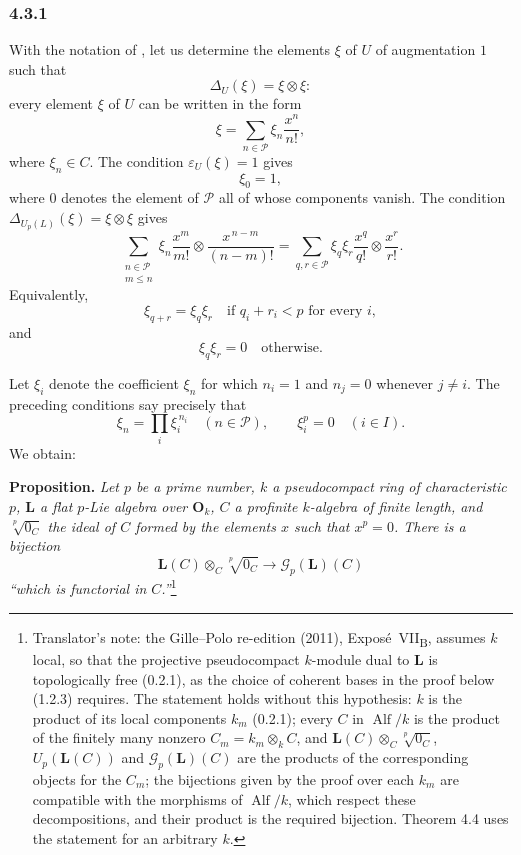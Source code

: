 
\subsubsection*{4.3.1}
\label{sga3:VIIB:4.3.1}

With the notation of , let us determine the elements
\(\xi\) of \(U\) of augmentation \(1\) such that
\[
  \Delta_U(\xi)=\xi\otimes\xi:
\]
every element \(\xi\) of \(U\) can be written in the form
\[
  \xi
  =
  \sum_{n\in\mathcal P}
  \xi_n\frac{x^n}{n!},
\]
where \(\xi_n\in C\).
The condition \(\varepsilon_U(\xi)=1\) gives
\[
  \xi_0=1,
\]
where \(0\) denotes the element of \(\mathcal P\) all of whose
components vanish. The condition
\(\Delta_{U_p(L)}(\xi)=\xi\otimes\xi\) gives
\[
  \sum_{\substack{n\in\mathcal P\\m\leq n}}
  \xi_n
  \frac{x^m}{m!}
  \otimes
  \frac{x^{\,n-m}}{(n-m)!}
  =
  \sum_{q,r\in\mathcal P}
  \xi_q\xi_r
  \frac{x^q}{q!}
  \otimes
  \frac{x^r}{r!}.
\]
Equivalently,
\[
  \xi_{q+r}=\xi_q\xi_r
  \quad\text{if }q_i+r_i<p\text{ for every }i,
\]
and
\[
  \xi_q\xi_r=0
  \quad\text{otherwise}.
\]

Let \(\xi_i\) denote the coefficient \(\xi_n\) for which
\(n_i=1\) and \(n_j=0\) whenever \(j\ne i\). The preceding
conditions say precisely that
\[
  \xi_n=\prod_i\xi_i^{\,n_i}
  \quad(n\in\mathcal P),
  \qquad
  \xi_i^p=0
  \quad(i\in I).
\]
We obtain:

\medskip
\noindent\textbf{Proposition.}
\label{sga3:VIIB:4.3.1:group-like-parametrization}
{\itshape Let \(p\) be a prime number, \(k\) a pseudocompact ring
of characteristic \(p\), \(\mathbf L\) a flat \(p\)-Lie algebra over
\(\mathbf O_k\), \(C\) a profinite \(k\)-algebra of finite length, and
\(\sqrt[p]{0_C}\) the ideal of \(C\) formed by the elements \(x\) such
that \(x^p=0\). There is a bijection
\[
  \mathbf L(C)\otimes_C\sqrt[p]{0_C}
  \longrightarrow
  \mathscr G_p(\mathbf L)(C)
\]
``which is functorial in \(C\).''}\footnote{Translator's note: the Gille--Polo re-edition (2011),
Expos\'e~VII\textsubscript{B}, assumes \(k\) local, so that the projective pseudocompact \(k\)-module dual to
\(\mathbf L\) is topologically free (0.2.1), as the choice of coherent bases in the proof below (1.2.3)
requires. The statement holds without this hypothesis: \(k\) is the product of its local components \(k_m\)
(0.2.1); every \(C\) in \(\operatorname{Alf}/k\) is the product of the finitely many nonzero
\(C_m=k_m\otimes_kC\), and \(\mathbf L(C)\otimes_C\sqrt[p]{0_C}\), \(U_p(\mathbf L(C))\) and
\(\mathscr G_p(\mathbf L)(C)\) are the products of the corresponding objects for the \(C_m\); the bijections
given by the proof over each \(k_m\) are compatible with the morphisms of \(\operatorname{Alf}/k\), which
respect these decompositions, and their product is the required bijection. Theorem 4.4 uses the statement for
an arbitrary \(k\).}

